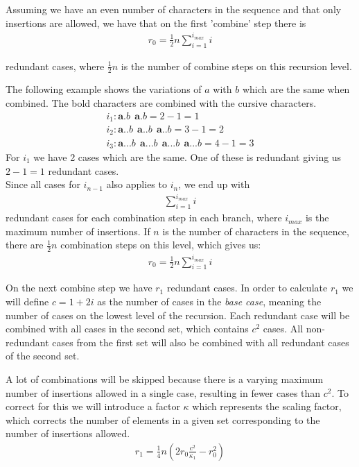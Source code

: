 \documentclass[12pt]{article}
\theoremstyle{definition}
\begin{document}
Assuming we have an even number of characters in the sequence and that only insertions are allowed, we have that on the first 'combine' step there is
\begin{eqnarray}
	\label{r_0}
	r_0 = \frac{1}{2}n\sum^{i_{max}}_{i=1} i
\end{eqnarray}

redundant cases, where $\frac{1}{2}n$ is the number of combine steps on this recursion level.

\begin{example}
The following example shows the variations of $a$ with $b$ which are the same when combined. The bold characters are combined with the cursive characters.
\begin{eqnarray}
	i_{1}: \textbf{a.}b\ \ \textbf{a}.b = 2 - 1 = 1 \\
	i_{2}: \textbf{a..}b\ \ \textbf{a.}.b\ \ \textbf{a}..b = 3 - 1 = 2 \\
	i_{3}: \textbf{a...}b\ \ \textbf{a..}.b\ \ \textbf{a.}..b\ \ \textbf{a}...b = 4 - 1 = 3
\end{eqnarray}
For $i_{1}$ we have 2 cases which are the same. One of these is redundant giving us $2 - 1 = 1$ redundant cases. \\
Since all cases for $i_{n-1}$ also applies to $i_{n}$, we end up with
\begin{eqnarray}
	\sum_{i=1}^{i_{max}}i
\end{eqnarray}
redundant cases for each combination step in each branch, where $i_{max}$ is the maximum number of insertions. If $n$ is the number of characters in the sequence, there are $\frac{1}{2}n$ combination steps on this level, which gives us:
\begin{eqnarray}
	r_0 = \frac{1}{2}n\sum^{i_{max}}_{i=1} i
\end{eqnarray}
\end{example}

On the next combine step we have $r_1$ redundant cases. In order to calculate $r_1$ we will define $c = 1 + 2i$ as the number of cases in the \textit{base case}, meaning the number of cases on the lowest level of the recursion. Each redundant case will be combined with all cases in the second set, which contains $c^2$ cases. All non-redundant cases from the first set will also be combined with all redundant cases of the second set. 

A lot of combinations will be skipped because there is a varying maximum number of insertions allowed in a single case, resulting in fewer cases than $c^2$. To correct for this we will introduce a factor $\kappa$ which represents the scaling factor, which corrects the number of elements in a given set corresponding to the number of insertions allowed.
\begin{eqnarray}
	\label{r_1}
	r_1 = \frac{1}{4}n(2r_0\frac{c^2}{\kappa_1} - r_0^2)
\end{eqnarray}
\end{document}
